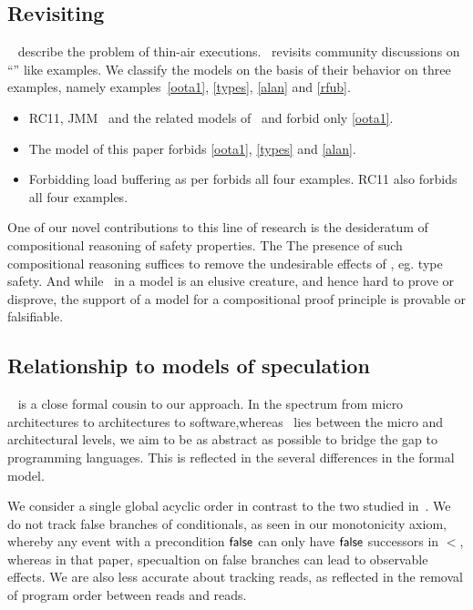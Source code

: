 \subsection{Revisiting \oota}
~\citet{DBLP:conf/esop/BattyMNPS15} describe the problem of thin-air executions.~\citet{BoehmOOTA} revisits community discussions on ``\oota'' like examples.  We classify the models on the basis of their behavior on three examples, namely examples~\eqref{oota1}, \eqref{types}, \eqref{alan} and \eqref{rfub}.  
\begin{itemize}
\item RC11\cite{DBLP:conf/pldi/LahavVKHD17}, JMM~\cite{Manson:2005:JMM:1047659.1040336} and the related models of~\citet{DBLP:conf/esop/JagadeesanPR10} and \citet{DBLP:conf/popl/KangHLVD17} forbid only \eqref{oota1}.
\item The model of this paper forbids \eqref{oota1}, \eqref{types} and \eqref{alan}.
\item Forbidding load buffering as per \citep{Dolan:2018:BDR:3192366.3192421,BoehmOOTA} forbids all four examples.  RC11\cite{DBLP:conf/pldi/LahavVKHD17} also forbids all four examples. 
\end{itemize}

One of our novel contributions to this line of research is the desideratum of compositional reasoning of safety properties. The The presence of such compositional reasoning suffices to remove the undesirable effects of \oota, eg. type safety.  And while \oota\ in a model is an elusive creature, and hence hard to prove or disprove,  the support of a model for a compositional proof principle is provable or falsifiable.  

\subsection{Relationship to models of speculation}
 ~\citet{2019-sp} is a close formal cousin to our approach.   In the spectrum from micro architectures to architectures to software,whereas~\citet{2019-sp} lies between the micro and architectural levels, we aim to be as abstract as possible to bridge the gap to programming languages.  This is reflected in the several differences in the formal model.  

We consider a single global acyclic order in contrast to the two studied in~\citet{2019-sp}.  We do not track false branches of conditionals, as seen in our monotonicity axiom, whereby any event with a precondition $\mathsf{false}$ can only have $\mathsf{false}$ successors in $\lt$, whereas in that paper, specualtion on false branches can lead to observable effects.   We are also less accurate  about tracking reads, as reflected in the removal of program order between reads and reads.   

